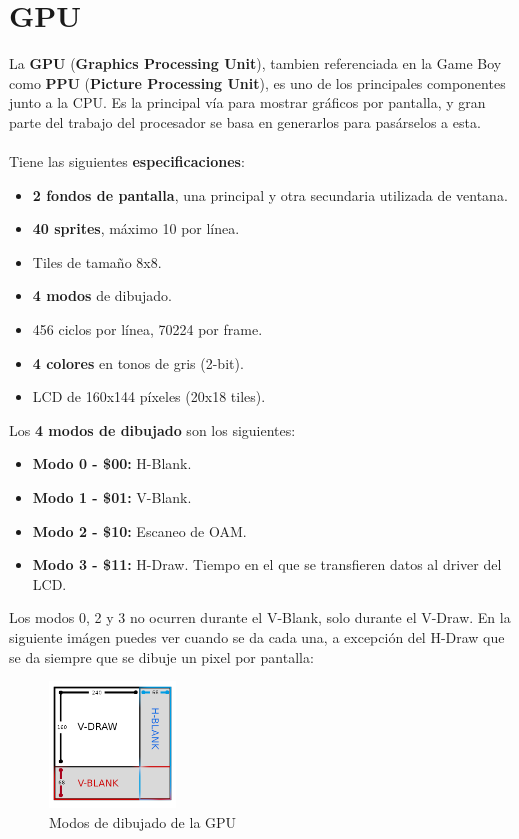 \clearpage

\section{GPU}
\label{anexo_gpu}

La \textbf{GPU} (\textbf{Graphics Processing Unit}), tambien referenciada en la Game Boy como \textbf{PPU} (\textbf{Picture Processing Unit}), es uno de los principales componentes junto a la CPU. Es la principal vía para mostrar gráficos por pantalla, y gran parte del trabajo del procesador se basa en generarlos para pasárselos a esta. 
\\ \\
Tiene las siguientes \textbf{especificaciones}:

\begin{itemize}
	\item \textbf{2 fondos de pantalla}, una principal y otra secundaria utilizada de ventana.
	\item \textbf{40 sprites}, máximo 10 por línea.
	\item Tiles de tamaño 8x8.
	\item \textbf{4 modos} de dibujado.
	\item 456 ciclos por línea, 70224 por frame.
	\item \textbf{4 colores} en tonos de gris (2-bit).
	\item LCD de 160x144 píxeles (20x18 tiles).
\end{itemize}

Los \textbf{4 modos de dibujado} son los siguientes:

\begin{itemize}
	\item \textbf{Modo 0 - \$00:} H-Blank.
	\item \textbf{Modo 1 - \$01:} V-Blank.
	\item \textbf{Modo 2 - \$10:} Escaneo de OAM.
	\item \textbf{Modo 3 - \$11:} H-Draw. Tiempo en el que se transfieren datos al driver del LCD.
\end{itemize}
\label{d_modes}

Los modos 0, 2 y 3 no ocurren durante el V-Blank, solo durante el V-Draw. En la siguiente imágen puedes ver cuando se da cada una, a excepción del H-Draw que se da siempre que se dibuje un pixel por pantalla:

\begin{figure}[h]
\centering
\includegraphics[width=0.3\textwidth]{include/images/VRAM/draw_modes.png}
\caption{Modos de dibujado de la GPU}
\label{figure:draw_modes}
\end{figure}

